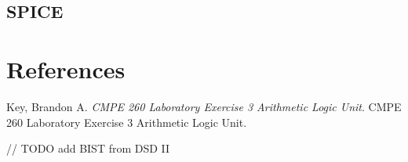 \documentclass[11pt]{article}
\begin{document}
		
		
		
		
		
		
		
		
		
		
		
		
		
		
		
	\subsection{SPICE}
	
		
		
		
		

		
\section{References}

	Key, Brandon A. \textit{CMPE 260 Laboratory Exercise 3 Arithmetic Logic Unit}. CMPE 260 Laboratory Exercise 3 Arithmetic Logic Unit.
	
	// TODO add BIST from DSD II
\end{document}
